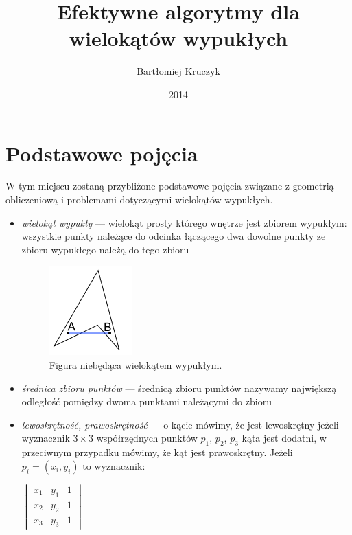 \documentclass[11pt,oneside,brudnopis]{xelatex-mgr/xmgr}
\author   {Bartłomiej Kruczyk}
\title    {Efektywne algorytmy dla wielokątów wypukłych}
\date     {2014}
\begin{document}
\begin{abstract}
\blindtext[1]
\end{abstract}

\keywords{}

\maketitle


\chapter{Podstawowe pojęcia}
W tym miejscu zostaną przybliżone podstawowe pojęcia związane z
geometrią obliczeniową i problemami dotyczącymi wielokątów wypukłych.

\begin{itemize}
\item{\emph{wielokąt wypukły}} --- wielokąt prosty którego wnętrze
  jest zbiorem wypukłym: wszystkie punkty należące do odcinka
  łączącego dwa dowolne punkty ze zbioru wypukłego należą do tego
  zbioru

  \begin{figure}[htp]
    \centering
    \includegraphics{img/nonconvex}
    \caption{Figura niebędąca wielokątem wypukłym.}
  \end{figure}

\item{\emph{średnica zbioru punktów}} --- średnicą zbioru punktów
  nazywamy największą odległość pomiędzy dwoma punktami należącymi do
  zbioru

\item{\emph{lewoskrętność, prawoskrętność}} --- o kącie mówimy, że
  jest lewoskrętny jeżeli wyznacznik $3 \times 3$ współrzędnych punktów
  $p_1$, $p_2$, $p_3$ kąta jest dodatni, w przeciwnym przypadku
  mówimy, że kąt jest prawoskrętny. Jeżeli $p_i = (x_i, y_i)$ to
  wyznacznik:

  \begin{center}
    \begin{math}
      \begin{vmatrix}
        x_1 & y_1 & 1 \\
        x_2 & y_2 & 1 \\
        x_3 & y_3 & 1
      \end{vmatrix}
    \end{math}
  \end{center}


\end{itemize}
\end{document}
